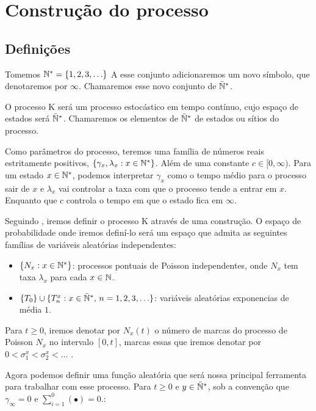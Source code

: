 \chapter{Construção do processo}
\label{cap:construcao}

\section{Definições}
\label{sec:definicoes}

Tomemos ${\mathbb{N^*}} = \{ 1, 2, 3, \ldots\}$ A esse conjunto adicionaremos um
novo símbolo, que denotaremos por $\infty$. Chamaremos esse novo
conjunto de ${\mathbb{\bar{N}^*}}$.

O processo K será um processo estocástico em tempo contínuo, cujo
espaço de estados será ${\mathbb{\bar{N}^*}}$. Chamaremos os elementos de ${\mathbb{\bar{N}^*}}$ de
estados ou sítios do processo.

Como parâmetros do processo, teremos uma família de números reais
estritamente positivos, $\{\gamma_x, \lambda_x : x \in {\mathbb{N^*}}\}$. Além de
uma constante $c \in [0, \infty)$.  Para um estado $x \in {\mathbb{N^*}}$,
podemos interpretar $\gamma_x$ como o tempo médio para o processo sair
de $x$ e $\lambda_x$ vai controlar a taxa com que o processo tende a
entrar em $x$. Enquanto que $c$ controla o tempo em que o estado fica
em $\infty$.

Seguindo \cite{fontes:08}, iremos definir o processo K através de uma
construção. O espaço de probabilidade onde iremos definí-lo
será um espaço que admita as seguintes famílias de variáveis
aleatórias independentes:

\begin{itemize}
\item $\{ N_x: x \in {\mathbb{N^*}} \}$: processos pontuais de Poisson
  independentes, onde $N_x$ tem taxa $\lambda_x$ para cada $x \in {\mathbb{N}}$.
\item $\{T_0\} \cup \{T_n^x: x \in {\mathbb{\bar{N}^*}} , \, n = 1, 2, 3, \ldots \}$:
  variáveis aleatórias exponencias de média $1$.
\end{itemize}

Para $t \geq 0$, iremos denotar por $N_x(t)$ o número de marcas do
processo de Poisson $N_x$ no intervalo $[0, t]$, marcas essas que
iremos denotar por $0 < \sigma_1^x < \sigma_2^x < \ldots$ .

Agora podemos definir uma função aleatória que será nossa principal
ferramenta para trabalhar com esse processo. Para $t \geq 0$ e $y \in
{\mathbb{\bar{N}^*}}$, sob a convenção que $\gamma_\infty = 0$ e $\sum_{i=1}^{0}(
\bullet ) = 0$.:

